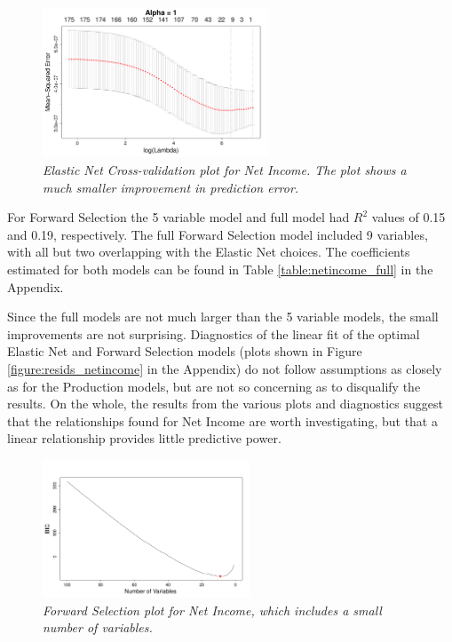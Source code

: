 \documentclass{article}
\begin{document}
\begin{figure}
\vspace*{-0.5cm}
\includegraphics[width=0.6\textwidth]{elastic_cv_netincome.pdf}
\setlength{\abovecaptionskip}{0pt}
\setlength{\belowcaptionskip}{-10pt}
\caption{\textsl{\small Elastic Net Cross-validation plot for Net Income. The plot shows a much smaller improvement in prediction error.}}
\label{figure:netincome_opt_e}
\end{figure}

For Forward Selection the 5 variable model and full model had $R^2$ values of 0.15 and 0.19, respectively. The full Forward 
Selection model included 9 variables, with all but two overlapping with the Elastic Net choices. The coefficients estimated for 
both models can be found in Table \ref{table:netincome_full} in the Appendix. 

Since the full models are not much larger than the 5 variable models, the small improvements are not surprising. Diagnostics of 
the linear fit of the optimal Elastic Net and Forward Selection models (plots shown in Figure 
\ref{figure:resids_netincome} in the Appendix) do not follow assumptions as closely as for the Production models, but are not so 
concerning as to disqualify the results. On the whole, the results from the various plots and diagnostics suggest that the 
relationships found for Net Income are worth investigating, but that a linear relationship provides little predictive power.

\begin{figure}[h!]
\centering
\includegraphics[width=0.55\textwidth]{forward_nvars_netincome.pdf}
\setlength{\belowcaptionskip}{-10pt}
\caption{\textsl{\small Forward Selection plot for Net Income, which includes a small number of variables.}}
\label{figure:netincome_opt_f}
\end{figure}
\end{document}
